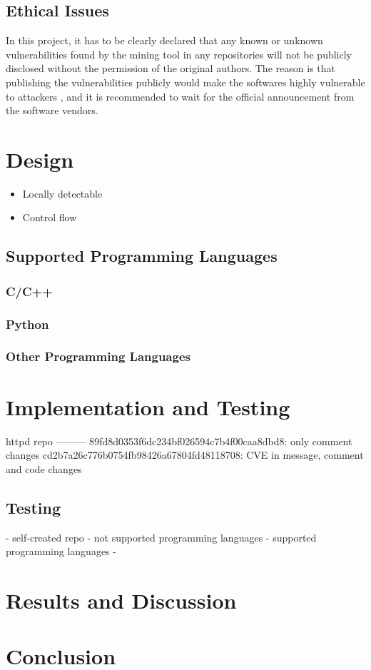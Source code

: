\documentclass[12pt, a4paper]{report}
\begin{document}
\section{Ethical Issues}
In this project, it has to be clearly declared that any known or unknown vulnerabilities found by
the mining tool in any repositories will not be publicly disclosed without the permission of the
original authors. The reason is that publishing the vulnerabilities publicly would make the
softwares highly vulnerable to attackers \cite{arora_2010}, and it is recommended to wait for the
official announcement from the software vendors.

\chapter{Design}
\begin{itemize}
  \item Locally detectable
  \item Control flow
\end{itemize}

\section{Supported Programming Languages}
\subsection{C/C++}
\subsection{Python}
\subsection{Other Programming Languages}

\chapter{Implementation and Testing}
httpd repo
---------
89fd8d0353f6dc234bf026594c7b4f00caa8dbd8: only comment changes
cd2b7a26c776b0754fb98426a67804fd48118708: CVE in message, comment and code changes

\section{Testing}
- self-created repo
- not supported programming languages
- supported programming languages
-

\chapter{Results and Discussion}

\chapter{Conclusion}

\printglossary
\printglossary[type=\acronymtype]
\printbibliography[heading=bibintoc]
\end{document}
